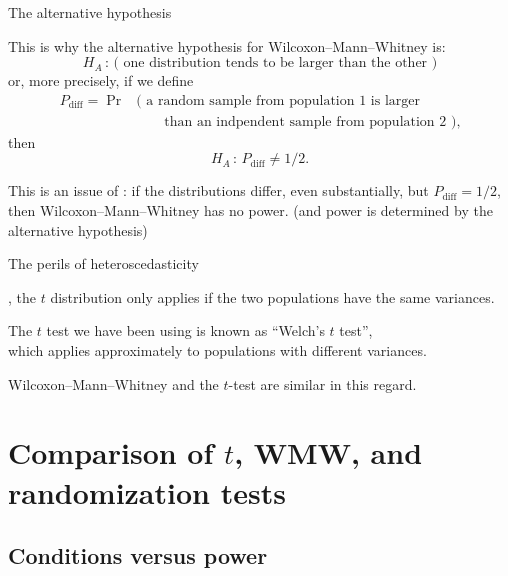 \begin{frame}{The alternative hypothesis}

  This is why the alternative hypothesis for Wilcoxon--Mann--Whitney is:
  \[  H_A \, : \, \text{( one distribution tends to be larger than the other )} \]
  or, more precisely, if we define
  \begin{align*}
    P_\text{diff} = \Pr & \text{( a random sample from population 1 is larger} \\
      & \qquad \text{than an indpendent sample from population 2 )} , 
  \end{align*}
  then
  \[  H_A \, : \, P_\text{diff} \neq 1/2 .\]

  \vspace{2em}

  This is an issue of :
  if the distributions differ, even substantially,
  but $P_\text{diff}=1/2$,
  then Wilcoxon--Mann--Whitney has \alert{no power}.
  (and power is determined by the alternative hypothesis)

\end{frame}


\begin{frame}{The perils of heteroscedasticity}

  , the $t$ distribution only applies 
  if the two populations have the \alert{same variances}.

    \vspace{2em}

  The $t$ test we have been using is known as ``Welch's $t$ test'',\\
  which applies approximately to populations with different variances.

    \vspace{2em}

    Wilcoxon--Mann--Whitney and the $t$-test are similar in this regard.

\end{frame}


\section{Comparison of $t$, WMW, and randomization tests}

\subsection{Conditions versus power}

